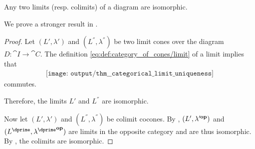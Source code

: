 \begin{lemma}\label{thm:categorical_limit_uniqueness_lemma}
  Any two limits (resp. colimits) of a diagram are isomorphic.

  We prove a stronger result in .
\end{lemma}
\begin{proof}
  Let \( (L', \lambda') \) and \( (L^\dprime, \lambda^\dprime) \) be two limit cones over the diagram \( D: \cat{I} \to \cat{C} \). The definition \eqref{eq:def:category_of_cones/limit} of a limit implies that
  \begin{equation}\label{eq:thm:categorical_limit_uniqueness}
    \begin{aligned}
      \texttt{[image: output/thm\_\_categorical\_limit\_uniqueness]}
    \end{aligned}
  \end{equation}
  commutes.

  Therefore, the limits \( L' \) and \( L^\dprime \) are isomorphic.

  Now let \( (L', \lambda') \) and \( (L^\dprime, \lambda^\dprime) \) be colimit cocones. By , \( (L', \lambda'^\oppos) \) and \( (L^\dprime, {\lambda^\dprime}^\oppos) \) are limits in the opposite category and are thus isomorphic. By , the colimits are isomorphic.
\end{proof}

